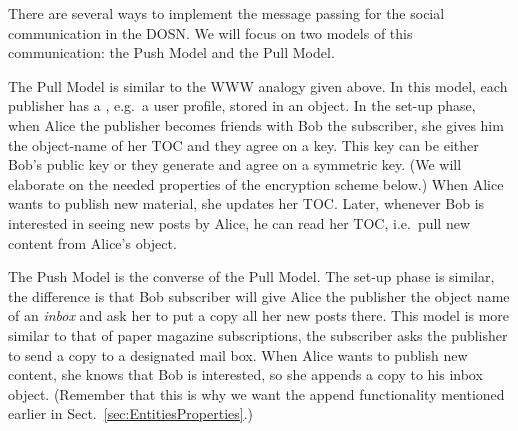 
There are several ways to implement the message passing for the social 
communication in the \ac{DOSN}.
We will focus on two models of this communication: the Push Model and the Pull 
Model.

The Pull Model is similar to the \ac{WWW} analogy given above.
In this model, each publisher has a , e.g.\ a user profile, stored in 
an object.
In the set-up phase, when Alice the publisher becomes friends with Bob the 
subscriber, she gives him the object-name of her \ac{TOC} and they agree on 
a key.
This key can be either Bob's public key or they generate and agree on 
a symmetric key.
(We will elaborate on the needed properties of the encryption scheme below.)
When Alice wants to publish new material, she updates her \ac{TOC}.
Later, whenever Bob is interested in seeing new posts by Alice, he can read her 
\ac{TOC}, i.e.\ pull new content from Alice's object.

The Push Model is the converse of the Pull Model.
The set-up phase is similar, the difference is that Bob subscriber will give 
Alice the publisher the object name of an \emph{inbox} and ask her to put 
a copy all her new posts there.
This model is more similar to that of paper magazine subscriptions, the 
subscriber asks the publisher to send a copy to a designated mail box.
When Alice wants to publish new content, she knows that Bob is interested, so 
she appends a copy to his inbox object.
(Remember that this is why we want the append functionality mentioned earlier 
in Sect.~\ref{sec:EntitiesProperties}.)


